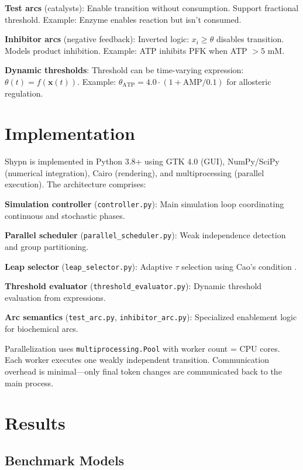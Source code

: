 \documentclass{bioinfo}
\begin{document}
\textbf{Test arcs} (catalysts): Enable transition without consumption. Support fractional threshold. Example: Enzyme enables reaction but isn't consumed.

\textbf{Inhibitor arcs} (negative feedback): Inverted logic: $x_i \geq \theta$ disables transition. Models product inhibition. Example: ATP inhibits PFK when ATP $> 5$ mM.

\textbf{Dynamic thresholds}: Threshold can be time-varying expression: $\theta(t) = f(\mathbf{x}(t))$. Example: $\theta_{\text{ATP}} = 4.0 \cdot (1 + \text{AMP}/0.1)$ for allosteric regulation.

\section{Implementation}

Shypn is implemented in Python 3.8+ using GTK 4.0 (GUI), NumPy/SciPy (numerical integration), Cairo (rendering), and multiprocessing (parallel execution). The architecture comprises:

\textbf{Simulation controller} (\texttt{controller.py}): Main simulation loop coordinating continuous and stochastic phases.

\textbf{Parallel scheduler} (\texttt{parallel\_scheduler.py}): Weak independence detection and group partitioning.

\textbf{Leap selector} (\texttt{leap\_selector.py}): Adaptive $\tau$ selection using Cao's condition \citep{cao2006efficient}.

\textbf{Threshold evaluator} (\texttt{threshold\_evaluator.py}): Dynamic threshold evaluation from expressions.

\textbf{Arc semantics} (\texttt{test\_arc.py}, \texttt{inhibitor\_arc.py}): Specialized enablement logic for biochemical arcs.

Parallelization uses \texttt{multiprocessing.Pool} with worker count = CPU cores. Each worker executes one weakly independent transition. Communication overhead is minimal---only final token changes are communicated back to the main process.

\section{Results}

\subsection{Benchmark Models}
\end{document}

